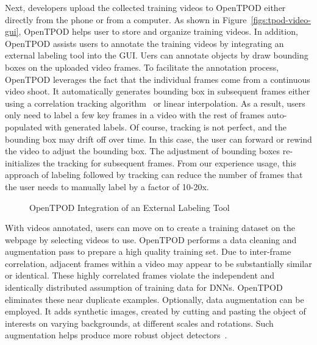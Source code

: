 Next, developers upload the collected training videos to OpenTPOD either directly
from the phone or from a computer. As shown in Figure~\ref{figs:tpod-video-gui},
OpenTPOD helps user to store and organize training videos. In addition, OpenTPOD assists
users to annotate the training videos by integrating an external labeling tool
into the GUI. Uers can annotate objects by draw bounding boxes on the uploaded
video frames. To facilitate the annotation process, OpenTPOD leverages the fact that
the individual frames come from a continuous video shoot. It automatically
generates bounding box in subsequent frames either using a correlation tracking
algorithm~\cite{danelljan2014accurate} or linear interpolation. As a result,
users only need to label a few key frames in a video with the rest of frames
auto-populated with generated labels. Of course, tracking is not perfect, and
the bounding box may drift off over time. In this case, the user can forward or
rewind the video to adjust the bounding box.  The adjustment of bounding boxes
re-initializes the tracking for subsequent frames. From our experience usage,
this approach of labeling followed by tracking can reduce the number of frames
that the user needs to manually label by a factor of 10-20x.

\begin{figure}[]
  \centering
  \caption{OpenTPOD Integration of an External Labeling Tool}
  \label{figs:tpod-label-gui}
\end{figure}

With videos annotated, users can move on to create a training dataset on the
webpage by selecting videos to use. OpenTPOD performs a data cleaning and
augmentation pass to prepare a high quality training set. Due to inter-frame
correlation, adjacent frames within a video may appear to be substantially
similar or identical. These highly correlated frames violate the independent and
identically distributed assumption of training data for DNNs. OpenTPOD eliminates
these near duplicate examples. Optionally, data augmentation can be employed. It
adds synthetic images, created by cutting and pasting the object of interests on
varying backgrounds, at different scales and rotations. Such augmentation helps
produce more robust object detectors~\cite{dwibedi2017cut}.


